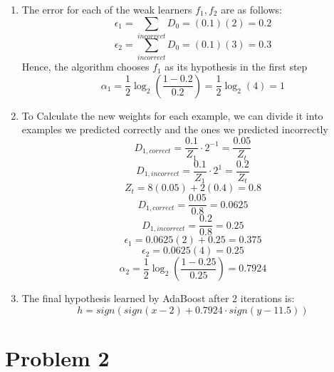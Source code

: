 \documentclass[11pt]{article}
\begin{document}
\begin{enumerate}
\item 
The error for each of the weak learners $f_1, f_2$ are as follows:
$$
\epsilon_1 = \sum_{incorrect} D_0 = (0.1)(2) = 0.2
$$
$$
\epsilon_2 = \sum_{incorrect} D_0 = (0.1)(3) = 0.3
$$
Hence, the algorithm chooses $f_1$ as its hypothesis in the first step
$$
\alpha_1 = \frac{1}{2} \log_2 \left( \frac{1 - 0.2}{0.2} \right) =  \frac{1}{2} \log_2 (4) = 1
$$

\item 
To Calculate the new weights for each example, we can divide it into examples we predicted correctly
and the ones we predicted incorrectly
$$
D_{1,correct} = \frac{0.1}{Z_1} \cdot 2^{-1} = \frac{0.05}{Z_t}
$$
$$
D_{1,incorrect} = \frac{0.1}{Z_1} \cdot 2^{1} = \frac{0.2}{Z_t}
$$
$$
Z_t = 8(0.05) + 2 (0.4) = 0.8
$$
$$
D_{1,correct} = \frac{0.05}{0.8} = 0.0625
$$
$$
D_{1,incorrect} = \frac{0.2}{0.8} = 0.25
$$
$$
\epsilon_1 = 0.0625(2) + 0.25 = 0.375
$$
$$
\epsilon_2 = 0.0625(4) = 0.25
$$
$$
\alpha_2 = \frac{1}{2} \log_2 \left( \frac{1 - 0.25}{0.25} \right) = 0.7924
$$
\item 
The final hypothesis learned by AdaBoost after 2 iterations is:
$$
h = sign(sign(x - 2) + 0.7924 \cdot sign( y - 11.5))
$$

\end{enumerate}

\newpage
\section{Problem 2}
\end{document}
